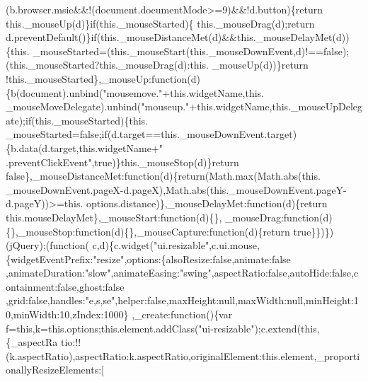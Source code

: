 \begin{DoxyCode}
      (b.browser.msie&&!(document.documentMode>=9)&&!d.button)\{\textcolor{keywordflow}{return} this.\_mouseUp(d)\}\textcolor{keywordflow}{if}(this.\_mouseStarted)\{
      this.\_mouseDrag(d);\textcolor{keywordflow}{return} d.preventDefault()\}\textcolor{keywordflow}{if}(this.\_mouseDistanceMet(d)&&this.\_mouseDelayMet(d))\{this.
      \_mouseStarted=(this.\_mouseStart(this.\_mouseDownEvent,d)!==\textcolor{keyword}{false});(this.\_mouseStarted?this.\_mouseDrag(d):this.
      \_mouseUp(d))\}\textcolor{keywordflow}{return} !this.\_mouseStarted\},\_mouseUp:\textcolor{keyword}{function}(d)\{b(document).unbind(\textcolor{stringliteral}{"mousemove."}+this.widgetName,this.
      \_mouseMoveDelegate).unbind(\textcolor{stringliteral}{"mouseup."}+this.widgetName,this.\_mouseUpDelegate);\textcolor{keywordflow}{if}(this.\_mouseStarted)\{this.
      \_mouseStarted=\textcolor{keyword}{false};\textcolor{keywordflow}{if}(d.target==\textcolor{keyword}{this}.\_mouseDownEvent.target)\{b.data(d.target,\textcolor{keyword}{this}.widgetName+\textcolor{stringliteral}{"
      .preventClickEvent"},\textcolor{keyword}{true})\}this.\_mouseStop(d)\}\textcolor{keywordflow}{return} \textcolor{keyword}{false}\},\_mouseDistanceMet:\textcolor{keyword}{function}(d)\{\textcolor{keywordflow}{return}(Math.max(Math.abs(\textcolor{keyword}{this}.
      \_mouseDownEvent.pageX-d.pageX),Math.abs(this.\_mouseDownEvent.pageY-d.pageY))>=this.
      options.distance)\},\_mouseDelayMet:\textcolor{keyword}{function}(d)\{\textcolor{keywordflow}{return} this.mouseDelayMet\},\_mouseStart:\textcolor{keyword}{function}(d)\{\},
      \_mouseDrag:\textcolor{keyword}{function}(d)\{\},\_mouseStop:\textcolor{keyword}{function}(d)\{\},\_mouseCapture:\textcolor{keyword}{function}(d)\{\textcolor{keywordflow}{return} \textcolor{keyword}{true}\}\})\})(jQuery);(\textcolor{keyword}{function}(
      c,d)\{c.widget(\textcolor{stringliteral}{"ui.resizable"},c.ui.mouse,\{widgetEventPrefix:\textcolor{stringliteral}{"resize"},options:\{alsoResize:false,animate:false
      ,animateDuration:\textcolor{stringliteral}{"slow"},animateEasing:\textcolor{stringliteral}{"swing"},aspectRatio:false,autoHide:false,containment:false,ghost:false
      ,grid:false,handles:\textcolor{stringliteral}{"e,s,se"},helper:false,maxHeight:null,maxWidth:null,minHeight:10,minWidth:10,zIndex:1000\}
      ,\_create:\textcolor{keyword}{function}()\{var f=this,k=this.options;this.element.addClass(\textcolor{stringliteral}{"ui-resizable"});c.extend(this,\{\_aspectRa
      tio:!!(k.aspectRatio),aspectRatio:k.aspectRatio,originalElement:this.element,\_proportionallyResizeElements:[

\end{DoxyCode}
